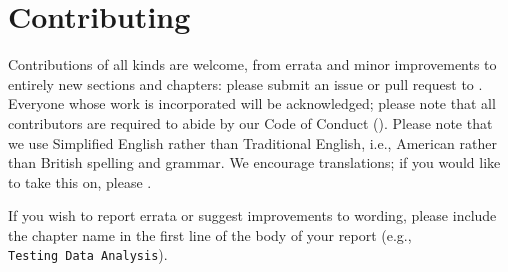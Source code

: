 \chapter{Contributing}\label{s:contributing}

Contributions of all kinds are welcome, from errata and minor improvements to
entirely new sections and chapters: please
submit an issue or pull request to . Everyone whose work is incorporated will be acknowledged;
please note that all contributors are required to abide by our Code of Conduct
().  Please note that we use Simplified English rather than
Traditional English, i.e., American rather than British spelling and grammar. We
encourage translations; if you would like to take this on, please .

If you wish to report errata or suggest improvements to wording, please include
the chapter name in the first line of the body of your report (e.g., \texttt{Testing\ Data\ Analysis}).
